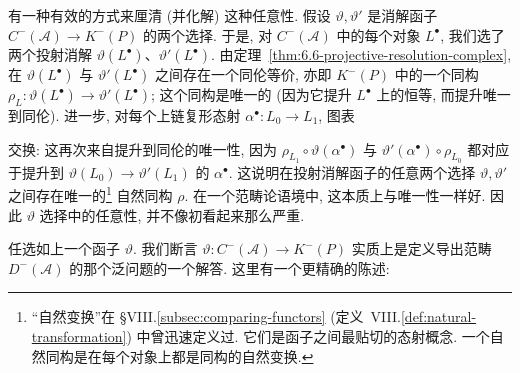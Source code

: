 \begin{remark}\label{rmk:6.8-resolution-functor}
有一种有效的方式来厘清 (并化解) 这种任意性. 假设 $\vartheta,\vartheta'$ 是消解函子 $C^{-}(\mathcal{A})\to K^{-}(P)$ 的两个选择. 于是, 对 $C^{-}(\mathcal{A})$ 中的每个对象 $L^\bullet$, 我们选了两个投射消解 $\vartheta(L^\bullet)$、$\vartheta'(L^\bullet)$. 由定理~\ref{thm:6.6-projective-resolution-complex}, 在 $\vartheta(L^\bullet)$ 与 $\vartheta'(L^\bullet)$ 之间存在一个同伦等价, 亦即 $K^{-}(P)$ 中的一个同构 $\rho_L:\vartheta(L^\bullet)\to\vartheta'(L^\bullet)$; 这个同构是唯一的 (因为它提升 $L^\bullet$ 上的恒等, 而提升唯一到同伦). 进一步, 对每个上链复形态射 $\alpha^\bullet:L_0\to L_1$, 图表

\begin{center}
\end{center}

\noindent 交换: 这再次来自提升到同伦的唯一性, 因为 $\rho_{L_1}\circ\vartheta(\alpha^\bullet)$ 与 $\vartheta'(\alpha^\bullet)\circ\rho_{L_0}$ 都对应于提升到 $\vartheta(L_0)\to\vartheta'(L_1)$ 的 $\alpha^\bullet$. 这说明在投射消解函子的任意两个选择 $\vartheta,\vartheta'$ 之间存在唯一的\footnote{``自然变换''在 §VIII.\ref{subsec:comparing-functors} (定义~VIII.\ref{def:natural-transformation}) 中曾迅速定义过. 它们是函子之间最贴切的态射概念. 一个自然同构是在每个对象上都是同构的自然变换.} 自然同构 $\rho$. 在一个范畴论语境中, 这本质上与唯一性一样好. 因此 $\vartheta$ 选择中的任意性, 并不像初看起来那么严重.
\end{remark}

\noindent 任选如上一个函子 $\vartheta$. 我们断言 $\vartheta:C^{-}(\mathcal{A})\to K^{-}(P)$ 实质上是定义导出范畴 $D^{-}(\mathcal{A})$ 的那个泛问题的一个解答. 这里有一个更精确的陈述:

